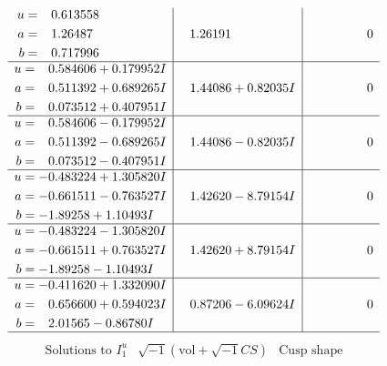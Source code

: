 \documentclass[1p]{elsarticle_modified}
\theoremstyle{definition}
\newcommand{\I}{\sqrt{-1}}
\begin{document}
$$\begin{array}{c|c|c}
\begin{aligned}
u &= \phantom{-}0.613558\phantom{ +0.000000I} \\
a &= \phantom{-}1.26487\phantom{ +0.000000I} \\
b &= \phantom{-}0.717996\phantom{ +0.000000I}\end{aligned}
 & \phantom{-}1.26191\phantom{ +0.000000I} & \phantom{-0.000000 } 0 \\ \hline\begin{aligned}
u &= \phantom{-}0.584606 + 0.179952 I \\
a &= \phantom{-}0.511392 + 0.689265 I \\
b &= \phantom{-}0.073512 + 0.407951 I\end{aligned}
 & \phantom{-}1.44086 + 0.82035 I & \phantom{-0.000000 } 0 \\ \hline\begin{aligned}
u &= \phantom{-}0.584606 - 0.179952 I \\
a &= \phantom{-}0.511392 - 0.689265 I \\
b &= \phantom{-}0.073512 - 0.407951 I\end{aligned}
 & \phantom{-}1.44086 - 0.82035 I & \phantom{-0.000000 } 0 \\ \hline\begin{aligned}
u &= -0.483224 + 1.305820 I \\
a &= -0.661511 - 0.763527 I \\
b &= -1.89258 + 1.10493 I\end{aligned}
 & \phantom{-}1.42620 - 8.79154 I & \phantom{-0.000000 } 0 \\ \hline\begin{aligned}
u &= -0.483224 - 1.305820 I \\
a &= -0.661511 + 0.763527 I \\
b &= -1.89258 - 1.10493 I\end{aligned}
 & \phantom{-}1.42620 + 8.79154 I & \phantom{-0.000000 } 0 \\ \hline\begin{aligned}
u &= -0.411620 + 1.332090 I \\
a &= \phantom{-}0.656600 + 0.594023 I \\
b &= \phantom{-}2.01565 - 0.86780 I\end{aligned}
 & \phantom{-}0.87206 - 6.09624 I & \phantom{-0.000000 } 0\\
 \hline 
 \end{array}$$\newpage$$\begin{array}{c|c|c}  
\text{Solutions to }I^u_{1}& \I (\text{vol} + \sqrt{-1}CS) & \text{Cusp shape}\\

\end{array}$$
\end{document}
